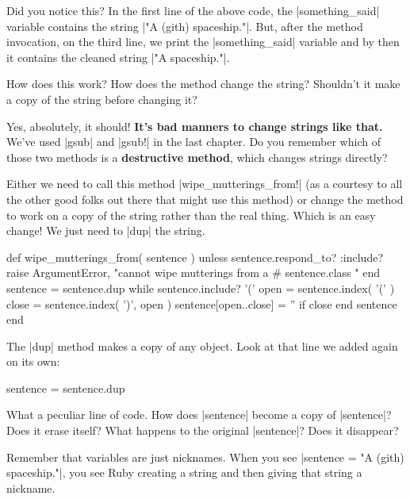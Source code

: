 \documentclass[12pt,twoside]{report}
\begin{document}
Did you notice this?  In the first line of the above code, the
\rubyinline|something_said| variable contains the
string \rubyinline|"A (gith) spaceship."|.  But, after
the method invocation, on the third line, we print the
\rubyinline|something_said| variable and by then it
contains the cleaned string \rubyinline|"A spaceship."|.

How does this work?  How does the method change the string?  Shouldn't
it make a copy of the string before changing it?

Yes, absolutely, it should!  {\bf It's bad manners to change strings
  like that.}  We've used \rubyinline|gsub| and
\rubyinline|gsub!| in the last chapter.  Do you
remember which of those two methods is a {\bf destructive method},
which changes strings directly?

Either we need to call this method
\rubyinline|wipe_mutterings_from!| (as a courtesy to
all the other good folks out there that might use this method) or
change the method to work on a copy of the string rather than the real
thing.  Which is an easy change!  We just need to
\rubyinline|dup| the string.


\begin{rubycode}

 def wipe_mutterings_from( sentence )
   unless sentence.respond_to? :include?
     raise ArgumentError,
       "cannot wipe mutterings from a #{ sentence.class }"
   end
   sentence = sentence.dup
   while sentence.include? '('
     open = sentence.index( '(' )
     close = sentence.index( ')', open )
     sentence[open..close] = '' if close
   end
   sentence
 end

\end{rubycode}


The \rubyinline|dup| method makes a copy of any
object.  Look at that line we added again on its own:


\begin{rubycode}

 sentence = sentence.dup

\end{rubycode}


What a peculiar line of code.  How does
\rubyinline|sentence| become a copy of
\rubyinline|sentence|? Does it erase itself?  What
happens to the original \rubyinline|sentence|?  Does
it disappear?

Remember that variables are just nicknames.  When you see
\rubyinline|sentence = "A (gith) spaceship."|, you see
Ruby creating a string and then giving that string a nickname.
\end{document}

